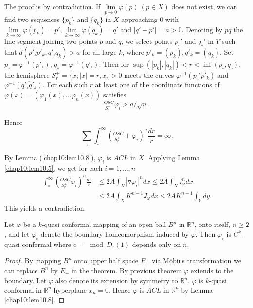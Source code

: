 The proof is by contradiction. If $\lim\limits_{p \to 0} \varphi (p)~
(p \in X)$ does not exist, we can find two sequences $\{ p_k\}$ and
$\{ q_k\}$ in $X$ approaching 0 with $\lim\limits_{k \to \infty}
\varphi (p_k)= p', \lim\limits_{k \to \infty} \varphi (q_k)= q'$ and
$|q' - p'|=a > 0$. Denoting by $\overline{pq}$ the line segment
joining two points $p$ and $q$, we select points $p_\circ'$ and
$q_\circ'$ in $Y$ such that $d(\overline{p'_\circ p'_k},
\overline{q'_\circ q_k})> a$ for all large $k$, where $p'_k= (p_k),
q'_k= (q_k)$. Set $p_\circ= \varphi^{-1} (p'_\circ)$, $q_\circ =
\varphi^{-1} (q'_\circ)$. Then for $\sup (|p_k|, |q_k|)< r < \inf
(p_\circ, q_\circ)$, the hemisphere $S^+_r= \{ x; |x|= r, x_n> 0$
\pageoriginale meets the curves $\varphi^{-1} \overline{(p_\circ' p'_k)}$ and
$\varphi^{-1}\overline{(q'_\circ q'_k)}$. For each such $r$ at least
one of the coordinate functions of $\varphi(x) = (\varphi_1 (x), \ldots
\varphi_n (x))$ satisfies 
$$
{}^{OSC}_{~S^+_r} \varphi_i > a/\sqrt{n}.
$$

Hence 
$$
\sum_i \int_\circ^\infty \left({}^{OSC}_{~S^+_r}+ \varphi_i \right)^n
\frac{dr}{r} = \infty.
$$

By Lemma (\ref{chap10:lem10.8}), $\varphi_i$ is $ACL$ in $X$. Applying
Lemma \ref{chap10:lem10.5}, we get for each $i=1, \ldots , n$
\begin{align*}
  \int_\circ^\infty \left( {}^{OSC}_{~S^+_r} \varphi_i\right)^n
  \frac{dr}{r} & \leq 2A \int_X |\triangledown \varphi_i|^n dx \leq 2A
  \int_X I^{n}_\varphi dx\\
  & \leq 2A \int_X K^{n-1} J_\varphi dx \leq 2A K^{n-1} \int_Y dy.
\end{align*}
This yields a contradiction.

\begin{thm} \label{chap10:thm10.15}
  Let $\varphi$ be a $k$-quasi conformal mapping of an open ball $B^n$
  in $\mathbb{R}^n$, onto itself, $n\geq 2$, and let $\varphi_\circ$
  denote the boundary homeomorphism induced by $\varphi$. Then
  $\varphi_\circ$ is $C^k$-quasi conformal where $c = \mod D_\tau (1)$
  depends only on $n$.
\end{thm}

\begin{proof}
  By mapping $B^n$ onto upper half space $E_+$ via M\"obius
  transformation we can replace $B^n$ by $E_+$ in the theorem. By
  previous theorem $\varphi$ extends to \pageoriginale the
  boundary. Let $\varphi$ also denote its extension by symmetry to
  $\mathbb{R}^n$. $\varphi$ is $k$-quasi conformal in
  $\mathbb{R}^n$-hyperplane $x_n=0$. Hence $\varphi$ is $ACL$ in
  $\mathbb{R}^n$ by Lemma \ref{chap10:lem10.8}.
\end{proof}

